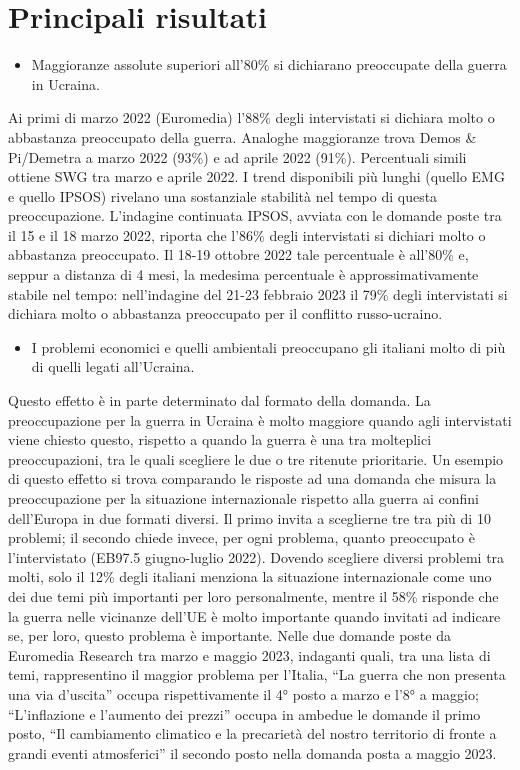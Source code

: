 \documentclass[
]{book}
\providecommand{\tightlist}{%
  \setlength{\itemsep}{0pt}\setlength{\parskip}{0pt}}
\begin{document}
\hypertarget{principali-risultati}{%
\section{Principali risultati}\label{principali-risultati}}

\begin{itemize}
\tightlist
\item
  Maggioranze assolute superiori all'80\% si dichiarano preoccupate della guerra in Ucraina.
\end{itemize}

Ai primi di marzo 2022 (Euromedia) l'88\% degli intervistati si dichiara molto o abbastanza preoccupato della guerra. Analoghe maggioranze trova Demos \& Pi/Demetra a marzo 2022 (93\%) e ad aprile 2022 (91\%). Percentuali simili ottiene SWG tra marzo e aprile 2022. I trend disponibili più lunghi (quello EMG e quello IPSOS) rivelano una sostanziale stabilità nel tempo di questa preoccupazione. L'indagine continuata IPSOS, avviata con le domande poste tra il 15 e il 18 marzo 2022, riporta che l'86\% degli intervistati si dichiari molto o abbastanza preoccupato. Il 18-19 ottobre 2022 tale percentuale è all'80\% e, seppur a distanza di 4 mesi, la medesima percentuale è approssimativamente stabile nel tempo: nell'indagine del 21-23 febbraio 2023 il 79\% degli intervistati si dichiara molto o abbastanza preoccupato per il conflitto russo-ucraino.

\begin{itemize}
\tightlist
\item
  I problemi economici e quelli ambientali preoccupano gli italiani molto di più di quelli legati all'Ucraina.
\end{itemize}

Questo effetto è in parte determinato dal formato della domanda. La preoccupazione per la guerra in Ucraina è molto maggiore quando agli intervistati viene chiesto questo, rispetto a quando la guerra è una tra molteplici preoccupazioni, tra le quali scegliere le due o tre ritenute prioritarie. Un esempio di questo effetto si trova comparando le risposte ad una domanda che misura la preoccupazione per la situazione internazionale rispetto alla guerra ai confini dell'Europa in due formati diversi. Il primo invita a sceglierne tre tra più di 10 problemi; il secondo chiede invece, per ogni problema, quanto preoccupato è l'intervistato (EB97.5 giugno-luglio 2022). Dovendo scegliere diversi problemi tra molti, solo il 12\% degli italiani menziona la situazione internazionale come uno dei due temi più importanti per loro personalmente, mentre il 58\% risponde che la guerra nelle vicinanze dell'UE è molto importante quando invitati ad indicare se, per loro, questo problema è importante.
Nelle due domande poste da Euromedia Research tra marzo e maggio 2023, indaganti quali, tra una lista di temi, rappresentino il maggior problema per l'Italia, ``La guerra che non presenta una via d'uscita'' occupa rispettivamente il 4° posto a marzo e l'8° a maggio; ``L'inflazione e l'aumento dei prezzi'' occupa in ambedue le domande il primo posto, ``Il cambiamento climatico e la precarietà del nostro territorio di fronte a grandi eventi atmosferici'' il secondo posto nella domanda posta a maggio 2023.
\end{document}
